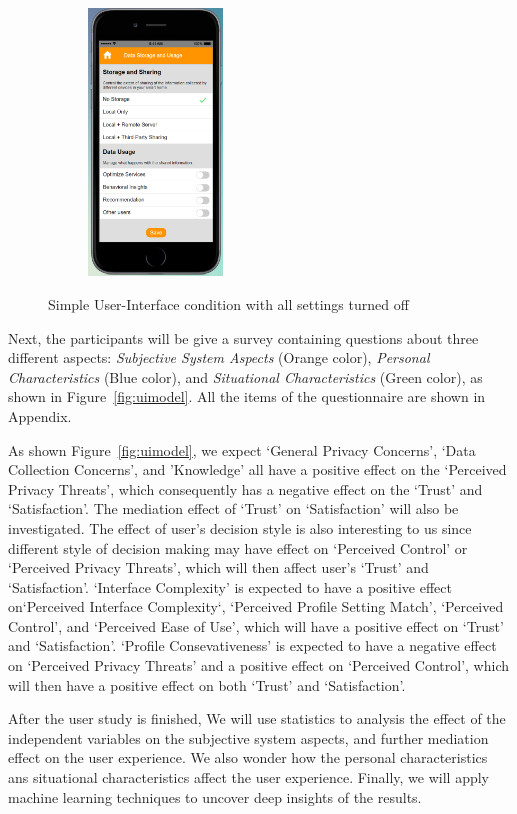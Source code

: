 \begin{figure}
\begin{subfigure}[t]{0.24\textwidth}
	\end{subfigure}%
	~
	\begin{subfigure}[t]{0.24\textwidth}
		\centering
		\includegraphics[height=2.8in]{figures/ui1allOff4.png}
	\end{subfigure}%
	\caption{Simple User-Interface condition with all settings turned off}
	\label{fig:ui1AllOff}
\end{figure}

Next, the participants will be give a survey containing questions about three different aspects: \textit{Subjective System Aspects} (Orange color), \textit{Personal Characteristics} (Blue color), and \textit{Situational Characteristics} (Green color), as shown in Figure~\ref{fig:uimodel}. All the items of the questionnaire are shown in Appendix.


As shown Figure~\ref{fig:uimodel}, we expect `General Privacy Concerns', `Data Collection Concerns', and 'Knowledge' all have a positive effect on the `Perceived Privacy Threats', which consequently has a negative effect on the `Trust' and `Satisfaction'. The mediation effect of `Trust' on `Satisfaction' will also be investigated. The effect of user's decision style is also interesting to us since different style of decision making may have effect on `Perceived Control' or `Perceived Privacy Threats', which will then affect user's `Trust' and `Satisfaction'. `Interface Complexity' is expected to have a positive effect on`Perceived Interface Complexity`, `Perceived Profile Setting Match', `Perceived Control', and `Perceived Ease of Use', which will have a positive effect on `Trust' and `Satisfaction'. `Profile Consevativeness' is expected to have a negative effect on `Perceived Privacy Threats' and a positive effect on `Perceived Control', which will then have a positive effect on both `Trust' and `Satisfaction'.

After the user study is finished, We will use statistics to analysis the effect of the independent variables on the subjective system aspects, and further mediation effect on the user experience. We also wonder how the personal characteristics ans situational characteristics affect the user experience. Finally, we will apply machine learning techniques to uncover deep insights of the results.